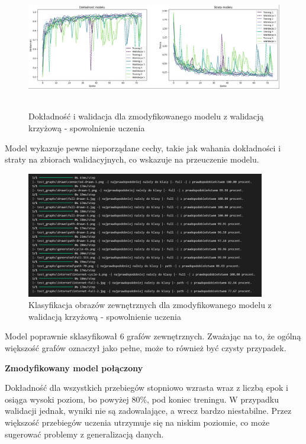 \begin{figure}[ht]
	\centering
	\includegraphics[height=5.5cm]{resources/tests/images/v4/crossvalid_4_img.png}
	\caption{Dokładność i walidacja dla zmodyfikowanego modelu z walidacją krzyżową - spowolnienie uczenia}
	\label{Fig:tests-cv-4a}
\end{figure}
\FloatBarrier

Model wykazuje pewne nieporządane cechy, takie jak wahania dokładności i straty na zbiorach walidacyjnych,
co wskazuje na przeuczenie modelu.

\begin{figure}[ht]
	\centering
	\includegraphics[height=5.5cm]{resources/tests/images/v4/crossvalid_4_txt.png}
	\caption{Klasyfikacja obrazów zewnętrznych dla zmodyfikowanego modelu z walidacją krzyżową - spowolnienie uczenia}
	\label{Fig:tests-cv-4b}
\end{figure}
\FloatBarrier

Model poprawnie sklasyfikował 6 grafów zewnętrznych.
Zważając na to, że ogólną większość grafów oznaczył jako pełne, może to również być czysty przypadek. 

\textbf{Zmodyfikowany model połączony}

Dokładność dla wszystkich przebiegów stopniowo wzrasta wraz z liczbą epok
i osiąga wysoki poziom, bo powyżej 80\%, pod koniec treningu.
W przypadku walidacji jednak, wyniki nie są zadowalające, a wrecz bardzo niestabilne.
Przez większość przebiegów uczenia utrzymuje się na niskim poziomie,
co może sugerować problemy z generalizacją danych.

